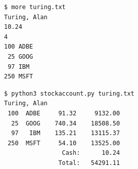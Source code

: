 \documentclass[8pt,a4paper,compress]{beamer}
\begin{document}
\begin{frame}[fragile]
\pause

\begin{lstlisting}[language={},style=focusin]
$ more turing.txt 
Turing, Alan
10.24
4
100 ADBE
 25 GOOG
 97 IBM
250 MSFT
\end{lstlisting}

\pause
\bigskip

\begin{lstlisting}[language={},style=focusin]
$ python3 stockaccount.py turing.txt 
Turing, Alan
 100  ADBE     91.32     9132.00
  25  GOOG    740.34    18508.50
  97   IBM    135.21    13115.37
 250  MSFT     54.10    13525.00
                Cash:      10.24
               Total:   54291.11
\end{lstlisting}
\end{frame}
\end{document}
